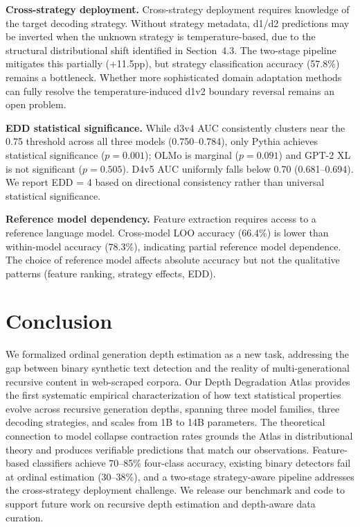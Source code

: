 \documentclass[11pt,a4paper]{article}
\newcommand{\edd}{\textsc{EDD}}
\begin{document}
\textbf{Cross-strategy deployment.} Cross-strategy deployment requires knowledge of the target decoding strategy. Without strategy metadata, d1/d2 predictions may be inverted when the unknown strategy is temperature-based, due to the structural distributional shift identified in Section~4.3. The two-stage pipeline mitigates this partially (+11.5pp), but strategy classification accuracy (57.8\%) remains a bottleneck. Whether more sophisticated domain adaptation methods can fully resolve the temperature-induced d1v2 boundary reversal remains an open problem.

\textbf{\edd{} statistical significance.} While d3v4 AUC consistently clusters near the 0.75 threshold across all three models (0.750--0.784), only Pythia achieves statistical significance ($p = 0.001$); OLMo is marginal ($p = 0.091$) and GPT-2 XL is not significant ($p = 0.505$). D4v5 AUC uniformly falls below 0.70 (0.681--0.694). We report \edd{} = 4 based on directional consistency rather than universal statistical significance.

\textbf{Reference model dependency.} Feature extraction requires access to a reference language model. Cross-model LOO accuracy (66.4\%) is lower than within-model accuracy (78.3\%), indicating partial reference model dependence. The choice of reference model affects absolute accuracy but not the qualitative patterns (feature ranking, strategy effects, \edd{}).

\section{Conclusion}

We formalized ordinal generation depth estimation as a new task, addressing the gap between binary synthetic text detection and the reality of multi-generational recursive content in web-scraped corpora. Our Depth Degradation Atlas provides the first systematic empirical characterization of how text statistical properties evolve across recursive generation depths, spanning three model families, three decoding strategies, and scales from 1B to 14B parameters. The theoretical connection to model collapse contraction rates grounds the Atlas in distributional theory and produces verifiable predictions that match our observations. Feature-based classifiers achieve 70--85\% four-class accuracy, existing binary detectors fail at ordinal estimation (30--38\%), and a two-stage strategy-aware pipeline addresses the cross-strategy deployment challenge. We release our benchmark and code to support future work on recursive depth estimation and depth-aware data curation.
\end{document}
